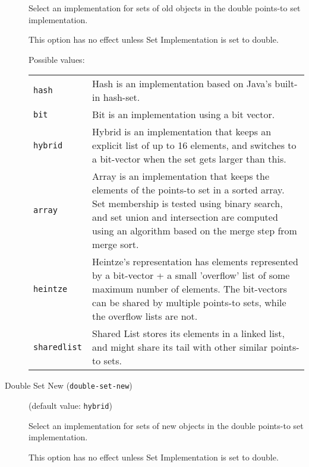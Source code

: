 \documentclass{article}
\begin{document}
\begin{description}
Select an implementation for sets of old objects in the double
points-to set implementation.

This option has no effect unless Set Implementation is set to double.
        



Possible values:\\
\begin{longtable}{p{1in}p{4in}}

{\tt hash }
&

Hash is an implementation based on Java's built-in hash-set.
\\

{\tt bit }
&

Bit is an implementation using a bit vector.
\\

{\tt hybrid }
&

Hybrid is an implementation that keeps an explicit list of up to
16 elements, and switches to a bit-vector when the set gets
larger than this.
\\

{\tt array }
&

Array is an implementation that keeps the elements of the
points-to set in a sorted array. Set membership is tested using
binary search, and set union and intersection are computed using
an algorithm based on the merge step from merge sort.
\\

{\tt heintze }
&
Heintze's representation has elements represented by a bit-vector + a small
									'overflow' list of some maximum number of elements.  The bit-vectors can be shared
									by multiple points-to sets, while the overflow lists are not.
								\\

{\tt sharedlist }
&
Shared List stores its elements in a linked list, and might share
									its tail with other similar points-to sets.
								\\

\end{longtable}


\item[Double Set New ({\tt double-set-new})]
(default value: {\tt hybrid})




Select an implementation for sets of new objects in the double
points-to set implementation.

This option has no effect unless Set Implementation is set to double.
        




\end{description}
\end{document}
